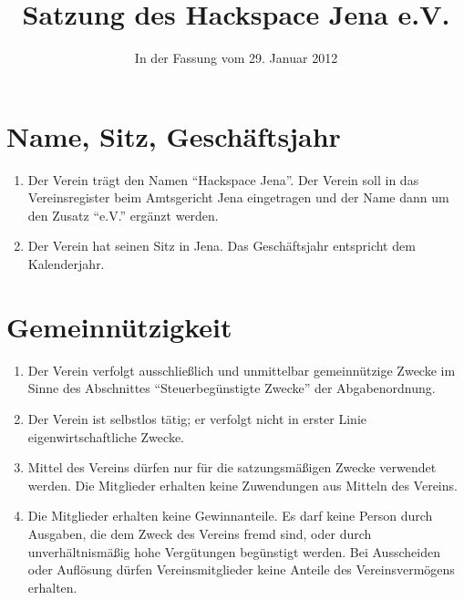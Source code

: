 \documentclass[fontsize=12pt,paper=a4,pagesize]{scrartcl}
\title{Satzung des Hackspace Jena e.V.}
\date{In der Fassung vom 29. Januar 2012}
\begin{document}
\maketitle
\section{Name, Sitz, Geschäftsjahr}

\begin{enumerate}
	\item Der Verein trägt den Namen "`Hackspace Jena"'. Der Verein soll in
		das Vereinsregister beim Amtsgericht Jena eingetragen und der Name
		dann um den Zusatz "`e.V."' ergänzt werden.
	\item Der Verein hat seinen Sitz in Jena. Das Geschäftsjahr entspricht
		dem Kalenderjahr.
\end{enumerate}

\section{Gemeinnützigkeit}

\begin{enumerate}
	\item Der Verein verfolgt ausschließlich und unmittelbar gemeinnützige
		Zwecke im Sinne des Abschnittes "`Steuerbegünstigte Zwecke"' der
		Abgabenordnung.
	\item Der Verein ist selbstlos tätig; er verfolgt nicht in erster Linie
		eigenwirtschaftliche Zwecke.
	\item Mittel des Vereins dürfen nur für die satzungsmäßigen Zwecke
		verwendet werden. Die Mitglieder erhalten keine Zuwendungen aus
		Mitteln des Vereins.
	\item Die Mitglieder erhalten keine Gewinnanteile. Es darf keine Person
		durch Ausgaben, die dem Zweck des Vereins fremd sind, oder durch
		unverhältnismäßig hohe Vergütungen begünstigt werden. Bei
		Ausscheiden oder Auflösung dürfen Vereinsmitglieder keine Anteile
		des Vereinsvermögens erhalten.
\end{enumerate}

\newpage
\end{document}
